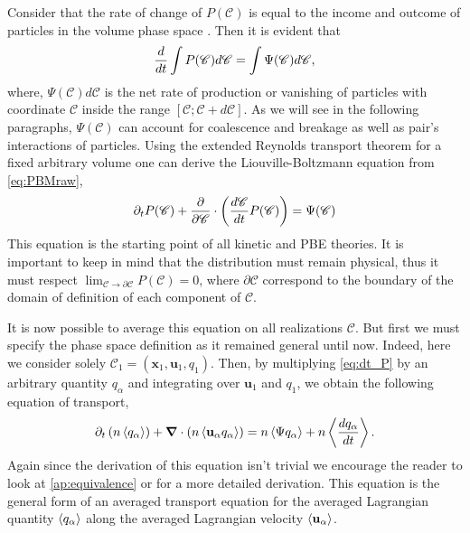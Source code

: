 Consider that the rate of change of $P(\mathscr{C})$ is equal to the income and outcome of particles in the volume phase space \citep{sporleder2012population}.
Then it is evident that
\begin{equation}
    \frac{d}{d t}\int P(\mathscr{C}) d\mathscr{C} 
    = \int \Psi(\mathscr{C}) d\mathscr{C},
    \label{eq:PBMraw}
\end{equation}
where, $\Psi(\mathscr{C})d\mathscr{C}$ is the net rate of production or vanishing of particles with coordinate $\mathscr{C}$ inside the range $[\mathscr{C};\mathscr{C}+d\mathscr{C}]$. 
As we will see in the following paragraphs, $\Psi(\mathscr{C})$ can account for coalescence and breakage as well as pair's interactions of particles.
Using the extended Reynolds transport theorem for a fixed arbitrary volume one can derive the Liouville-Boltzmann equation from \ref{eq:PBMraw}\citep{zaepffel2011modelisation,rao2008introduction,zhang1994ensemble},
\begin{equation}
    \partial_t P(\mathscr{C})
    +  \frac{\partial}{\partial \mathscr{C}} \cdot
    \left(
        \frac{d\mathscr{C}}{dt}  
        P(\mathscr{C})
    \right)
    = \Psi(\mathscr{C})
    \label{eq:dt_P}
\end{equation}
This equation is the starting point of all kinetic and PBE theories.
It is important to keep in mind that the distribution must remain physical, thus it must respect $\lim_{\mathscr{C} \rightarrow \partial\mathscr{C}} P(\mathscr{C})= 0$, where $\partial \mathscr{C}$ correspond to the boundary of the domain of definition of each component of $\mathscr{C}$. 

It is now possible to average this equation on all realizations $\mathscr{C}$. 
But first we must specify the phase space definition as it remained general until now. 
Indeed, here we consider solely $\mathscr{C}_1 = (\textbf{x}_1,\textbf{u}_1,q_1)$. 
Then, by multiplying \ref{eq:dt_P} by an arbitrary quantity $q_\alpha$ and integrating over $\textbf{u}_1$ and $q_1$, we obtain the following equation of transport,
\begin{equation}
    \label{eq:maxwell}
    \partial_t \left( n \left<q_\alpha\right>\right)
    + \bm{\nabla} \cdot \left(n \left<\textbf{u}_\alpha q_\alpha\right>\right)
    = n \left<\Psi q_\alpha\right>
    + n \left<\frac{dq_\alpha}{dt}\right>.
\end{equation}
Again since the derivation of this equation isn't trivial we encourage the reader to look at \ref{ap:equivalence} or \citet{rao2008introduction,zaepffel2011modelisation} for a more detailed derivation. 
This equation is the general form of an averaged transport equation for the averaged Lagrangian quantity $\left<q_\alpha\right>$ along the averaged Lagrangian velocity $\left<\textbf{u}_\alpha\right>$.

